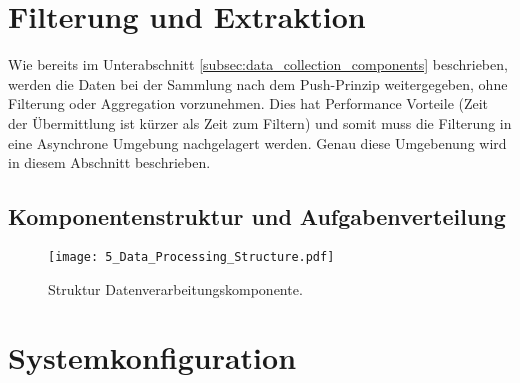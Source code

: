\section{Filterung und Extraktion}
\label{sec:data_extraction_concept}
Wie bereits im Unterabschnitt \ref{subsec:data_collection_components} beschrieben, werden die Daten bei der Sammlung nach dem Push-Prinzip weitergegeben, ohne Filterung oder Aggregation vorzunehmen. Dies hat Performance Vorteile (Zeit der Übermittlung ist kürzer als Zeit zum Filtern) und somit muss die Filterung in eine Asynchrone Umgebung nachgelagert werden. Genau diese Umgebenung wird in diesem Abschnitt beschrieben.

\subsection{Komponentenstruktur und Aufgabenverteilung}

\begin{figure}[H]
\centering
\texttt{[image: 5\_Data\_Processing\_Structure.pdf]}
\caption{Struktur Datenverarbeitungskomponente.}
\label{fig:structure_data_processing}
\end{figure}

\section{Systemkonfiguration}
\label{sec:integration_concept}


